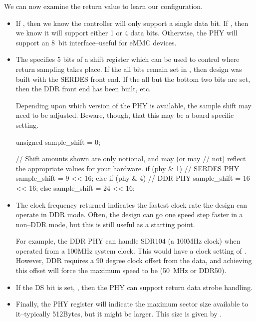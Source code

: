 \documentclass{gqtekspec}
\begin{document}
We can now examine the  return value to learn our configuration.
\begin{itemize}
\item If , then we know the controller will
	only support a single data bit.  If
	, then we know it will
	support either 1 or 4 data bits.  Otherwise, the PHY will support
	an 8~bit interface--useful for eMMC devices.

\item The  specifies 5 bits of a shift register
	which can be used to control where return sampling takes place.  If
	the all bits remain set in , then design was built
	with the SERDES front end.  If the all but the bottom two bits are
	set, then the DDR front end has been built, etc.

	Depending upon which version of the PHY is available, the sample
	shift may need to be adjusted.  Beware, though, that this may be
	a board specific setting.

\begin{zCpp}
	unsigned	sample_shift = 0;

	// Shift amounts shown are only notional, and may (or may
	// not) reflect the appropriate values for your hardware.
	if (phy & 1) {
		// SERDES PHY
		sample_shift = 9 << 16;
	} else if (phy & 4) {
		// DDR PHY
		sample_shift = 16 << 16;
	} else
		sample_shift = 24 << 16;
\end{zCpp}


\item The clock frequency returned indicates the fastest clock rate the design
	can operate in DDR mode.  Often, the design can go one speed step
	faster in a non--DDR mode, but this is still useful as a starting
	point.

	For example, the DDR PHY can handle SDR104 (a 100MHz clock) when
	operated from a 100MHz system clock.  This would have a clock setting
	of .  However, DDR requires a 90 degree
	clock offset from the data, and achieving this offset will force
	the maximum speed to be  (50~MHz or
	DDR50).

\item If the DS bit is set, , then the PHY can
	support return data strobe handling.

\item Finally, the PHY register will indicate the maximum sector size
	available to it--typically 512Bytes, but it might be larger.
	This size is given by .
\end{itemize}
\end{document}
